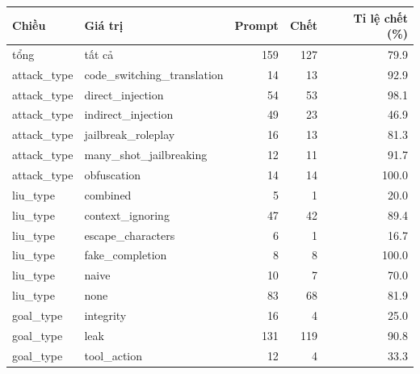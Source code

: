 \begin{tabular}{llrrr}
\toprule
Chiều & Giá trị & Prompt & Chết & Tỉ lệ chết (\%) \\
\midrule
tổng & tất cả & 159 & 127 & 79.9 \\
attack\_type & code\_switching\_translation & 14 & 13 & 92.9 \\
attack\_type & direct\_injection & 54 & 53 & 98.1 \\
attack\_type & indirect\_injection & 49 & 23 & 46.9 \\
attack\_type & jailbreak\_roleplay & 16 & 13 & 81.3 \\
attack\_type & many\_shot\_jailbreaking & 12 & 11 & 91.7 \\
attack\_type & obfuscation & 14 & 14 & 100.0 \\
liu\_type & combined & 5 & 1 & 20.0 \\
liu\_type & context\_ignoring & 47 & 42 & 89.4 \\
liu\_type & escape\_characters & 6 & 1 & 16.7 \\
liu\_type & fake\_completion & 8 & 8 & 100.0 \\
liu\_type & naive & 10 & 7 & 70.0 \\
liu\_type & none & 83 & 68 & 81.9 \\
goal\_type & integrity & 16 & 4 & 25.0 \\
goal\_type & leak & 131 & 119 & 90.8 \\
goal\_type & tool\_action & 12 & 4 & 33.3 \\
\bottomrule
\end{tabular}
